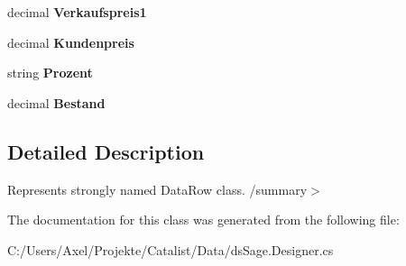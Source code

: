 \begin{DoxyCompactItemize}
\item 
decimal {\bfseries Verkaufspreis1}\hypertarget{class_products_1_1_data_1_1ds_sage_1_1_product_row_a0325f5380e45f825b4dd2575cdf0bd83}{}\label{class_products_1_1_data_1_1ds_sage_1_1_product_row_a0325f5380e45f825b4dd2575cdf0bd83}

\item 
decimal {\bfseries Kundenpreis}\hypertarget{class_products_1_1_data_1_1ds_sage_1_1_product_row_a1371ceb1897da55ac96d91f000d38608}{}\label{class_products_1_1_data_1_1ds_sage_1_1_product_row_a1371ceb1897da55ac96d91f000d38608}

\item 
string {\bfseries Prozent}\hypertarget{class_products_1_1_data_1_1ds_sage_1_1_product_row_ac8f5092d7e644c37cb5bb4bf4db3f59b}{}\label{class_products_1_1_data_1_1ds_sage_1_1_product_row_ac8f5092d7e644c37cb5bb4bf4db3f59b}

\item 
decimal {\bfseries Bestand}\hypertarget{class_products_1_1_data_1_1ds_sage_1_1_product_row_a25f11c8c04cfe2ef29329b0ed8a5584b}{}\label{class_products_1_1_data_1_1ds_sage_1_1_product_row_a25f11c8c04cfe2ef29329b0ed8a5584b}

\end{DoxyCompactItemize}


\subsection{Detailed Description}
Represents strongly named Data\+Row class. /summary$>$ 

The documentation for this class was generated from the following file\+:\begin{DoxyCompactItemize}
\item 
C\+:/\+Users/\+Axel/\+Projekte/\+Catalist/\+Data/ds\+Sage.\+Designer.\+cs\end{DoxyCompactItemize}
